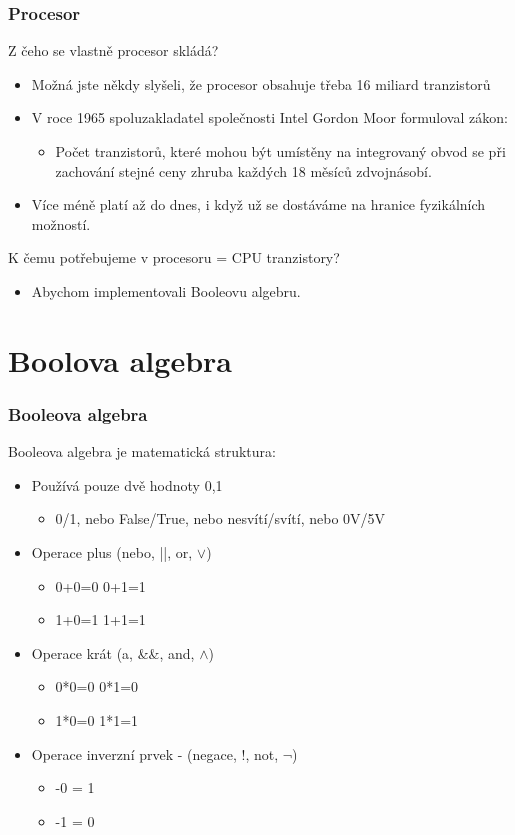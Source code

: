 \documentclass{beamer}
\begin{document}
\begin{frame}
\frametitle{Procesor}

Z čeho se vlastně procesor skládá?
\begin{itemize}
\item Možná jste někdy slyšeli, že procesor obsahuje třeba 16 miliard tranzistorů
\item V roce 1965 spoluzakladatel společnosti Intel Gordon Moor formuloval zákon: 
\begin{itemize}
\item Počet tranzistorů, které mohou být umístěny na integrovaný obvod se při zachování stejné ceny zhruba každých 18 měsíců zdvojnásobí.
\end{itemize}
\item Více méně platí až do dnes, i když už se dostáváme na hranice fyzikálních možností.
\end{itemize}

K čemu potřebujeme v procesoru = CPU tranzistory?
\begin{itemize}
\item Abychom implementovali Booleovu algebru.
\end{itemize}
\end{frame}



\section{Boolova algebra}



\begin{frame}
\frametitle{Booleova algebra}

Booleova algebra je matematická struktura:
\begin{itemize}
\item Používá pouze dvě hodnoty 0,1
\begin{itemize}
\item 0/1, nebo False/True, nebo nesvítí/svítí, nebo 0V/5V
\end{itemize}
\item Operace plus (nebo, ||, or, $\lor$)
\begin{itemize}
\item 0+0=0 \phantom{XXXX}  0+1=1
\item 1+0=1 \phantom{XXXX}  1+1=1
\end{itemize}
\item Operace krát (a, \&\&, and, $\land$)
\begin{itemize}
\item 0*0=0 \phantom{XXXX}  0*1=0
\item 1*0=0 \phantom{XXXX}  1*1=1
\end{itemize}
\item Operace inverzní prvek - (negace, !, not, $\neg$)
\begin{itemize}
\item -0 = 1
\item -1 = 0
\end{itemize}
\end{itemize}
\end{frame}
\end{document}
